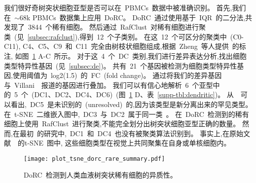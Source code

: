 我们很好奇树突状细胞亚型是否可以在~PBMCs~数据中被准确识别。
首先,我们在~${\sim}68$k PBMCs~数据集上应用~DoRC。
DoRC~通过使用基于~IQR~的二分法,共发现了~3844~个稀有细胞。
然后通过~RafClust~对稀有细胞进行聚类~(见~\ref{subsec:rafclust}),得到~12~个子类别。
在这~12~个可区分的聚类中~(C0-C11),
C4、C5、C9~和~C11~完全由树枝状细胞组成,根据~Zheng~等人提供~\cite{zheng2017massively}的标注,
如图~\ref{fig:dorc_dendritic} A-C~所示。
对于这~4~个~DC~类别,我们进行差异表达分析,找出细胞类型特异性基因~(见~\ref{subsec:de})。
共有~21~个基因被检测为细胞类型特异性基因,使用阈值为~log2(1.5)~的~FC~(fold change)。
通过将我们的差异基因与~Villani~\cite{villani2017single}~报道的基因进行叠加。
我们可以有信心地解析~6~个亚型中的~5~个~(DC1、DC2、DC4、DC6)~(图~\ref{fig:dorc_dendritic} D、表~\ref{supp-tbl:dendritic})。
从~\cite{villani2017single}~可以看出,~DC5~是未识别的~(unresolved)~的,因为该类型是新分离出来的罕见类型。
在~t-SNE~二维嵌入图中,~DC3~与~DC2~属于同一类~\cite{maaten2008visualizing}。
在~DoRC~检测到的稀有细胞上使用~RafClust~进行聚类,不能完全划分出树突状细胞亚型正确的数量。
然而,在最初~\cite{zheng2017massively}的研究中,~DC1~和~DC4~也没有被聚类算法识别到。
事实上,在原始文献~\cite{zheng2017massively}~的t-SNE~图中,
这些细胞类型在视觉上共同聚集在自身或单核细胞内。
\begin{figure}[!htbp]
    \centering
    \texttt{[image: plot\_tsne\_dorc\_rare\_summary.pdf]}
    \caption{
    DoRC~检测到人类血液树突状稀有细胞的异质性。
    }
    \label{fig:dorc_dendritic}
\end{figure}

